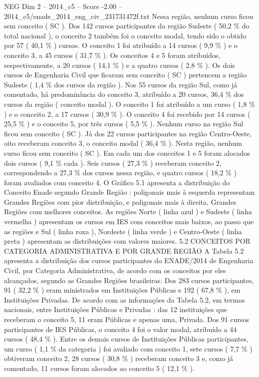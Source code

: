 \begin{textsample}{NEG Dim 2 – 2014\_c5 – Score -2.00 – 2014\_c5/enade\_2014\_eng\_civ\_231731472f.txt}
Nessa região, nenhum curso ficou sem conceito ( SC ).
Dos 142 cursos participantes da região Sudeste ( 50,2 \% do total nacional ), o conceito 2 também foi o conceito modal, tendo sido o obtido por 57 ( 40,1 \% ) cursos.
O conceito 1 foi atribuído a 14 cursos ( 9,9 \% ) e o conceito 3, a 45 cursos ( 31,7 \% ).
Os conceitos 4 e 5 foram atribuídos, respectivamente, a 20 cursos ( 14,1 \% ) e a quatro cursos ( 2,8 \% ).
Os dois cursos de Engenharia Civil que ficaram sem conceito ( SC ) pertencem a região Sudeste ( 1,4 \% dos cursos da região ).
Nos 55 cursos da região Sul, como já comentado, há predominância do conceito 3, atribuído a 20 cursos, 36,4 \% dos cursos da região ( conceito modal ).
O conceito 1 foi atribuído a um curso ( 1,8 \% ) e o conceito 2, a 17 cursos ( 30,9 \% ).
O conceito 4 foi recebido por 14 cursos ( 25,5 \% ) e o conceito 5, por três cursos ( 5,5 \% ).
Nenhum curso na região Sul ficou sem conceito ( SC ).
Já dos 22 cursos participantes na região Centro-Oeste, oito receberam conceito 3, o conceito modal ( 36,4 \% ).
Nesta região, nenhum curso ficou sem conceito ( SC ).
Em cada um dos conceitos 1 e 5 foram alocados dois cursos ( 9,1 \% cada ).
Seis cursos ( 27,3 \% ) receberam conceito 2, correspondendo a 27,3 \% dos cursos nessa região, e quatro cursos ( 18,2 \% ) foram avaliados com conceito 4.
O Gráfico 5.1 apresenta a distribuição do Conceito Enade segundo Grande Região : poligonais mais à esquerda representam Grandes Regiões com pior distribuição, e poligonais mais à direita, Grandes Regiões com melhores conceitos.
As regiões Norte ( linha azul ) e Sudeste ( linha vermelha ) apresentam os cursos em IES com conceitos mais baixos, ao passo que as regiões e Sul ( linha roxa ), Nordeste ( linha verde ) e Centro-Oeste ( linha preta ) apresentam as distribuições com valores maiores. 5.2 CONCEITOS POR CATEGORIA ADMINISTRATIVA E POR GRANDE REGIÃO A Tabela 5.2 apresenta a distribuição dos cursos participantes do ENADE/2014 de Engenharia Civil, por Categoria Administrativa, de acordo com os conceitos por eles alcançados, segundo as Grandes Regiões brasileiras.
Dos 283 cursos participantes, 91 ( 32,2 \% ) eram ministrados em Instituições Públicas e 192 ( 67,8 \% ), em Instituições Privadas.
De acordo com as informações da Tabela 5.2, em termos nacionais, entre Instituições Públicas e Privadas : das 12 instituições que receberam o conceito 5, 11 eram Públicas e apenas uma, Privada.
Dos 91 cursos participantes de IES Públicas, o conceito 4 foi o valor modal, atribuído a 44 cursos ( 48,4 \% ).
Entre os demais cursos de Instituições Públicas participantes, um curso ( 1,1 \% da categoria ) foi avaliado com conceito 1, sete cursos ( 7,7 \% ) obtiveram conceito 2, 28 cursos ( 30,8 \% ) receberam conceito 3 e, como já comentado, 11 cursos foram alocados ao conceito 5 ( 12,1 \% ).

\end{textsample}
